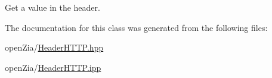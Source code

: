 Get a value in the header. 



The documentation for this class was generated from the following files\+:\begin{DoxyCompactItemize}
\item 
open\+Zia/\mbox{\hyperlink{_header_h_t_t_p_8hpp}{Header\+H\+T\+T\+P.\+hpp}}\item 
open\+Zia/\mbox{\hyperlink{_header_h_t_t_p_8ipp}{Header\+H\+T\+T\+P.\+ipp}}\end{DoxyCompactItemize}

